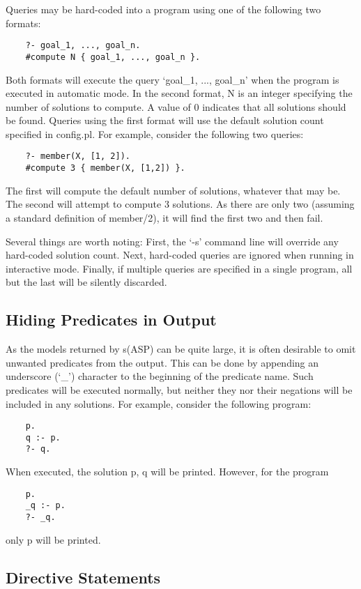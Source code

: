 \documentclass[]{article}
\begin{document}
Queries may be hard-coded into a program using one of the following two formats:
\begin{verbatim}
    ?- goal_1, ..., goal_n.
    #compute N { goal_1, ..., goal_n }.
\end{verbatim}
Both formats will execute the query `goal\_1, ..., goal\_n' when the program is
executed in automatic mode. In the second format, N is an integer specifying
the number of solutions to compute. A value of 0 indicates that all solutions
should be found. Queries using the first format will use the default solution
count specified in config.pl. For example, consider the following two queries:
\begin{verbatim}
    ?- member(X, [1, 2]).
    #compute 3 { member(X, [1,2]) }.
\end{verbatim}
The first will compute the default number of solutions, whatever that may be.
The second will attempt to compute 3 solutions. As there are only two (assuming
a standard definition of member/2), it will find the first two and then fail.

Several things are worth noting: First, the `-s' command line will override any
hard-coded solution count. Next, hard-coded queries are ignored when running in
interactive mode. Finally, if multiple queries are specified in a single
program, all but the last will be silently discarded.


\subsection{Hiding Predicates in Output}

As the models returned by s(ASP) can be quite large, it is often desirable to
omit unwanted predicates from the output. This can be done by appending an
underscore (`\_') character to the beginning of the predicate name. Such
predicates will be executed normally, but neither they nor their negations will
be included in any solutions. For example, consider the following program:
\begin{verbatim}
    p.
    q :- p.
    ?- q.
\end{verbatim}
When executed, the solution { p, q } will be printed. However, for the program
\begin{verbatim}
    p.
    _q :- p.
    ?- _q.
\end{verbatim}
only { p } will be printed.


\subsection{Directive Statements}
\end{document}
